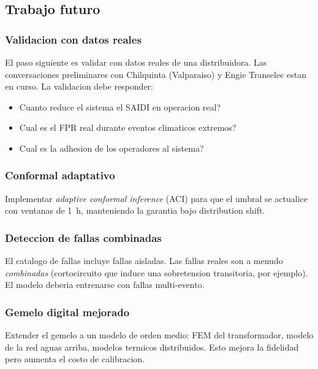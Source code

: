 \subsection{Trabajo futuro}

\subsubsection{Validacion con datos reales}

El paso siguiente es validar con datos reales de una distribuidora.
Las conversaciones preliminares con Chilquinta (Valparaiso) y
Engie Transelec estan en curso. La validacion debe responder:

\begin{itemize}[leftmargin=*,itemsep=2pt]
  \item Cuanto reduce el sistema el SAIDI en operacion real?
  \item Cual es el FPR real durante eventos climaticos extremos?
  \item Cual es la adhesion de los operadores al sistema?
\end{itemize}

\subsubsection{Conformal adaptativo}

Implementar \emph{adaptive conformal inference} (ACI) para que el
umbral se actualice con ventanas de 1~h, manteniendo la garantia
bajo distribution shift.

\subsubsection{Deteccion de fallas combinadas}

El catalogo de fallas incluye fallas aisladas. Las fallas reales
son a menudo \emph{combinadas} (cortocircuito que induce una
sobretension transitoria, por ejemplo). El modelo deberia entrenarse
con fallas multi-evento.

\subsubsection{Gemelo digital mejorado}

Extender el gemelo a un modelo de orden medio: FEM del
transformador, modelo de la red aguas arriba, modelos termicos
distribuidos. Esto mejora la fidelidad pero aumenta el costo de
calibracion.

